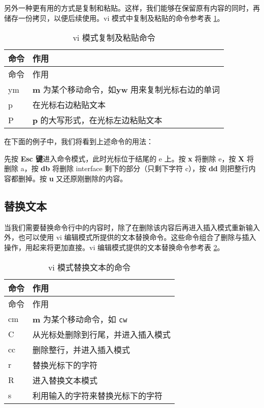 \documentclass[]{ctexbook}
\newenvironment{Shaded}{\begin{snugshade}}{\end{snugshade}}
\newcommand{\ExtensionTok}[1]{#1}
\newcommand{\NormalTok}[1]{#1}
\begin{document}
另外一种更有用的方式是复制和粘贴。这样，我们能够在保留原有内容的同时，再储存一份拷贝，以便后续使用。vi 模式中复制及粘贴的命令参考表 \ref{tab:vi-copy}。

\begin{longtable}[]{@{}ll@{}}
\caption{\label{tab:vi-copy} vi 模式复制及粘贴命令}\tabularnewline
\toprule
命令 & 作用\tabularnewline
\midrule
\endfirsthead
\toprule
命令 & 作用\tabularnewline
\midrule
\endhead
ym & \textbf{m} 为某个移动命令，如\textbf{yw} 用来复制光标右边的单词\tabularnewline
p & 在光标右边粘贴文本\tabularnewline
P & \textbf{p} 的大写形式，在光标左边粘贴文本\tabularnewline
\bottomrule
\end{longtable}

在下面的例子中，我们将看到上述命令的用法：

\begin{Shaded}
\end{Shaded}

先按 \textbf{Esc 键}进入命令模式，此时光标位于结尾的 e 上。按 \textbf{x} 将删除 e，按 \textbf{X} 将删除 a，按 \textbf{db} 将删除 interface 剩下的部分（只剩下字符 c），按 \textbf{dd} 则把整行内容都删掉。按 \textbf{u} 又还原刚删除的内容。

\hypertarget{ux66ffux6362ux6587ux672c}{%
\subsection{替换文本}\label{ux66ffux6362ux6587ux672c}}

当我们需要替换命令行中的内容时，除了在删除该内容后再进入插入模式重新输入外，也可以使用 vi 编辑模式所提供的文本替换命令。这些命令组合了删除与插入操作，用起来将更加直接。vi 编辑模式提供的文本替换命令参考表 \ref{tab:vi-replace}。

\begin{longtable}[]{@{}ll@{}}
\caption{\label{tab:vi-replace} vi 模式替换文本的命令}\tabularnewline
\toprule
命令 & 作用\tabularnewline
\midrule
\endfirsthead
\toprule
命令 & 作用\tabularnewline
\midrule
\endhead
cm & \textbf{m} 为某个移动命令，如 \texttt{cw}\tabularnewline
C & 从光标处删除到行尾，并进入插入模式\tabularnewline
cc & 删除整行，并进入插入模式\tabularnewline
r & 替换光标下的字符\tabularnewline
R & 进入替换文本模式\tabularnewline
s & 利用输入的字符来替换光标下的字符\tabularnewline
\bottomrule
\end{longtable}
\end{document}
